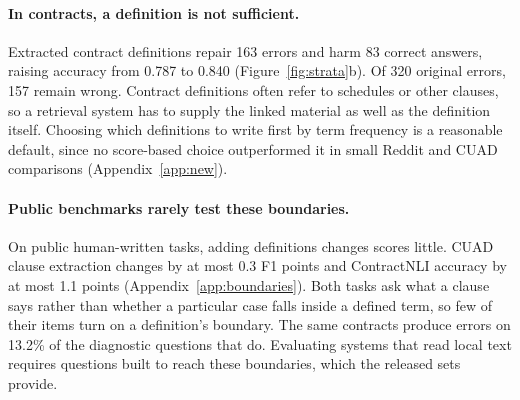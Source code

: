 \paragraph{In contracts, a definition is not sufficient.}
Extracted contract definitions repair 163 errors and harm 83 correct answers, raising accuracy from 0.787 to 0.840 (Figure~\ref{fig:strata}b). Of 320 original errors, 157 remain wrong. Contract definitions often refer to schedules or other clauses, so a retrieval system has to supply the linked material as well as the definition itself. Choosing which definitions to write first by term frequency is a reasonable default, since no score-based choice outperformed it in small Reddit and CUAD comparisons (Appendix~\ref{app:new}).

\paragraph{Public benchmarks rarely test these boundaries.}
On public human-written tasks, adding definitions changes scores little. CUAD clause extraction changes by at most 0.3 F1 points and ContractNLI \citep{contractnli} accuracy by at most 1.1 points (Appendix~\ref{app:boundaries}). Both tasks ask what a clause says rather than whether a particular case falls inside a defined term, so few of their items turn on a definition's boundary. The same contracts produce errors on 13.2\% of the diagnostic questions that do. Evaluating systems that read local text requires questions built to reach these boundaries, which the released sets provide.
